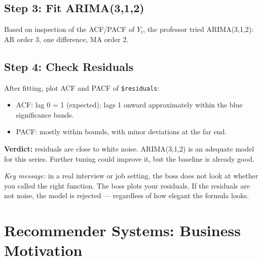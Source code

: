 \documentclass[11pt]{article}
\begin{document}
\subsection{Step 3: Fit ARIMA(3,1,2)}
Based on inspection of the ACF/PACF of $Y_t$, the professor tried
ARIMA(3,1,2): AR order 3, one difference, MA order 2.

\subsection{Step 4: Check Residuals}
After fitting, plot ACF and PACF of \texttt{\$residuals}:
\begin{itemize}
    \item ACF: lag 0 = 1 (expected); lags 1 onward approximately within
      the blue significance bands.
    \item PACF: mostly within bounds, with minor deviations at the
      far end.
\end{itemize}
\textbf{Verdict:} residuals are close to white noise. ARIMA(3,1,2) is an
adequate model for this series. Further tuning could improve it, but the
baseline is already good.

\textit{Key message:} in a real interview or job setting, the boss does not
look at whether you called the right function. The boss plots your residuals.
If the residuals are not noise, the model is rejected --- regardless of how
elegant the formula looks.


\section{Recommender Systems: Business Motivation}
\end{document}
